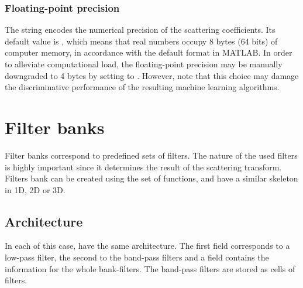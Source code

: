 \documentclass{article}
\begin{document}
\subsubsection{Floating-point precision}
The string  encodes the numerical precision of the scattering coefficients. Its default value is , which means that real numbers occupy 8 bytes (64 bits) of computer memory, in accordance with the default format in MATLAB. In order to alleviate computational load, the floating-point precision may be manually downgraded to 4 bytes by setting  to . However, note that this choice may damage the discriminative performance of the resulting machine learning algorithms.

\section{Filter banks \label{sec:filters}}
Filter banks correspond to predefined sets of filters. The nature of the used filters is highly important since it determines the result of the scattering transform. Filters bank can be created using the  set of functions, and have a similar skeleton in 1D, 2D or 3D.

\subsection{Architecture \label{sub:filters-architecture}}
 
 In each of this case,  have the same architecture. The first field corresponds to a low-pass filter, the second to the band-pass filters and a field  contains the information for the whole bank-filters.
 The band-pass filters are stored as cells of filters.
\end{document}

